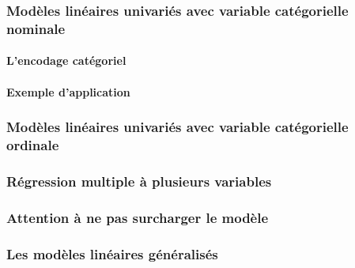 \documentclass[]{book}
\let\oldparagraph\paragraph
\renewcommand{\paragraph}[1]{\oldparagraph{#1}\mbox{}}
\begin{document}
\hypertarget{moduxe8les-linuxe9aires-univariuxe9s-avec-variable-catuxe9gorielle-nominale}{%
\subsubsection{\texorpdfstring{Modèles linéaires univariés avec variable
catégorielle
\textbf{nominale}}{Modèles linéaires univariés avec variable catégorielle nominale}}\label{moduxe8les-linuxe9aires-univariuxe9s-avec-variable-catuxe9gorielle-nominale}}

\hypertarget{lencodage-catuxe9goriel}{%
\paragraph{L'encodage catégoriel}\label{lencodage-catuxe9goriel}}

\hypertarget{exemple-dapplication}{%
\paragraph{Exemple d'application}\label{exemple-dapplication}}

\hypertarget{moduxe8les-linuxe9aires-univariuxe9s-avec-variable-catuxe9gorielle-ordinale}{%
\subsubsection{\texorpdfstring{Modèles linéaires univariés avec variable
catégorielle
\textbf{ordinale}}{Modèles linéaires univariés avec variable catégorielle ordinale}}\label{moduxe8les-linuxe9aires-univariuxe9s-avec-variable-catuxe9gorielle-ordinale}}

\hypertarget{ruxe9gression-multiple-uxe0-plusieurs-variables}{%
\subsubsection{Régression multiple à plusieurs
variables}\label{ruxe9gression-multiple-uxe0-plusieurs-variables}}

\hypertarget{attention-uxe0-ne-pas-surcharger-le-moduxe8le}{%
\subsubsection{Attention à ne pas surcharger le
modèle}\label{attention-uxe0-ne-pas-surcharger-le-moduxe8le}}

\hypertarget{les-moduxe8les-linuxe9aires-guxe9nuxe9ralisuxe9s}{%
\subsubsection{Les modèles linéaires
généralisés}\label{les-moduxe8les-linuxe9aires-guxe9nuxe9ralisuxe9s}}
\end{document}
